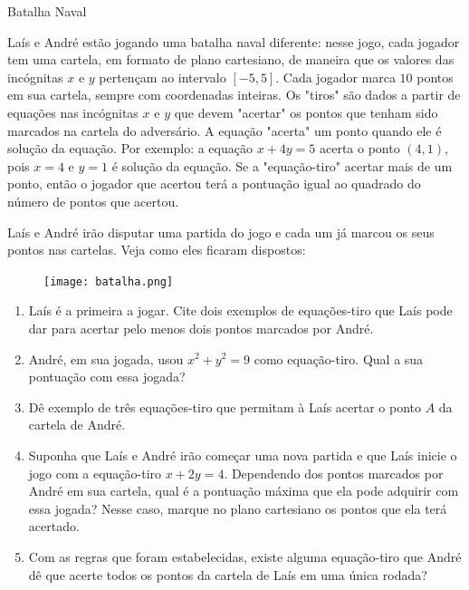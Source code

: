 \begin{task}{Batalha Naval}
\label{batalha-naval}

Laís e André estão jogando uma batalha naval diferente: nesse jogo, cada jogador tem uma cartela, em formato de plano cartesiano, de maneira que os valores das incógnitas $x$ e $y$ pertençam ao intervalo $[-5,5]$. Cada jogador marca $10$ pontos em sua cartela, sempre com coordenadas inteiras. Os "tiros"{} são dados a partir de equações nas incógnitas $x$ e $y$ que devem "acertar"{} os pontos que tenham sido marcados na cartela do adversário. A equação "acerta"{} um ponto quando ele é solução da equação. Por exemplo: a equação $x+4y=5$ acerta o ponto $(4,1)$, pois $x = 4$ e $y = 1$ é solução da equação. Se a "equação-tiro"{} acertar mais de um ponto, então o jogador que acertou terá a pontuação igual ao quadrado do número de pontos que acertou.

Laís e André irão disputar uma partida do jogo e cada um já marcou os seus pontos nas cartelas. Veja como eles ficaram dispostos:

\begin{figure}[H]
\centering

\noindent\texttt{[image: batalha.png]}
\end{figure}

\begin{enumerate}
\item {}
	Laís é a primeira a jogar. Cite dois exemplos de equações-tiro que Laís pode dar para acertar pelo menos dois pontos marcados por André.

\item {}
	André, em sua jogada, usou $x^2 + y^2 = 9$ como equação-tiro. Qual a sua pontuação com essa jogada?

\item {}
	Dê exemplo de três equações-tiro que permitam à Laís acertar o ponto $A$ da cartela de André.

\item {}
	Suponha que Laís e André irão começar uma nova partida e que Laís inicie o jogo com a equação-tiro $x+2y = 4$. Dependendo dos pontos marcados por André em sua cartela, qual é a pontuação máxima que ela pode adquirir com essa jogada? Nesse caso, marque no plano cartesiano os pontos que ela terá acertado.

\item {}
	Com as regras que foram estabelecidas, existe alguma equação-tiro que André dê que acerte todos os pontos da cartela de Laís em uma única rodada?

\end{enumerate}

\end{task}


